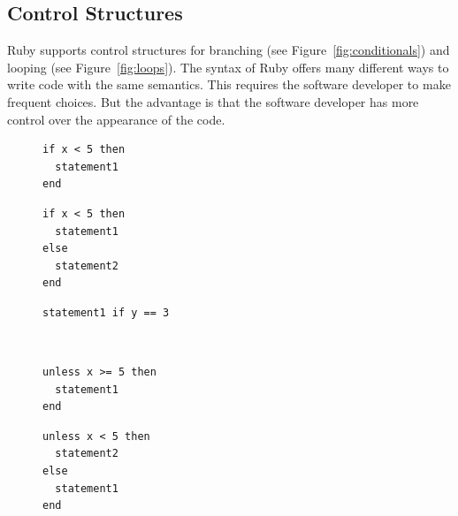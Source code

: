 \documentclass[12pt,a4paper,oneside,openright]{book}
\newcommand{\Ie}{That is, }
\newcommand{\fig}[1]{Figure~\ref{fig:#1}}
\begin{document}
\begin{CJK}{UTF8}{}
\subsection{Control Structures}
Ruby supports control structures for branching (see \fig{conditionals}) and looping (see \fig{loops}). The syntax of Ruby offers many different ways to write code with the same semantics. This requires the software developer to make frequent choices. But the advantage is that the software developer has more control over the appearance of the code. %
\begin{figure}[htbp]
  \lstset{language=Ruby,frame=single,numbers=none}
  \begin{center}
    \begin{minipage}[c]{.3\textwidth}
      \begin{lstlisting}
if x < 5 then
  statement1
end
      \end{lstlisting}
    \end{minipage}\hspace{1ex}
    \begin{minipage}[c]{.3\textwidth}
      \begin{lstlisting}
if x < 5 then
  statement1
else
  statement2
end
      \end{lstlisting}
    \end{minipage}\hspace{1ex}
    \begin{minipage}[c]{.3\textwidth}
      \begin{lstlisting}
statement1 if y == 3
      \end{lstlisting}
    \end{minipage}\\
    \begin{minipage}[c]{.3\textwidth}
      \begin{lstlisting}
unless x >= 5 then
  statement1
end
      \end{lstlisting}
    \end{minipage}\hspace{1ex}
    \begin{minipage}[c]{.3\textwidth}
      \begin{lstlisting}
unless x < 5 then
  statement2
else
  statement1
end
      \end{lstlisting}
    \end{minipage}\hspace{1ex}

\end{center}
\end{figure}
\end{CJK}
\end{document}
